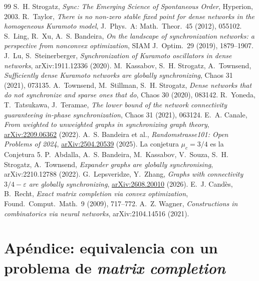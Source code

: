 \documentclass[11pt,a4paper]{article}
\begin{document}
\begin{thebibliography}{99}
 S.~H. Strogatz, \emph{Sync: The Emerging Science of Spontaneous Order}, Hyperion, 2003.
 R.~Taylor, \emph{There is no non-zero stable fixed point for dense networks in the homogeneous Kuramoto model}, J.\ Phys.\ A: Math.\ Theor.\ 45 (2012), 055102.
 S.~Ling, R.~Xu, A.~S. Bandeira, \emph{On the landscape of synchronization networks: a perspective from nonconvex optimization}, SIAM J.\ Optim.\ 29 (2019), 1879--1907.
 J.~Lu, S.~Steinerberger, \emph{Synchronization of Kuramoto oscillators in dense networks}, arXiv:1911.12336 (2020).
 M.~Kassabov, S.~H. Strogatz, A.~Townsend, \emph{Sufficiently dense Kuramoto networks are globally synchronizing}, Chaos 31 (2021), 073135.
 A.~Townsend, M.~Stillman, S.~H. Strogatz, \emph{Dense networks that do not synchronize and sparse ones that do}, Chaos 30 (2020), 083142.
 R.~Yoneda, T.~Tatsukawa, J.~Teramae, \emph{The lower bound of the network connectivity guaranteeing in-phase synchronization}, Chaos 31 (2021), 063124.
 E.~A. Canale, \emph{From weighted to unweighted graphs in synchronizing graph theory}, \href{https://arxiv.org/abs/2209.06362}{arXiv:2209.06362} (2022).
 A.~S. Bandeira et al., \emph{Randomstrasse101: Open Problems of 2024}, \href{https://arxiv.org/abs/2504.20539}{arXiv:2504.20539} (2025). La conjetura $\mu_c = 3/4$ es la Conjetura 5.
 P.~Abdalla, A.~S. Bandeira, M.~Kassabov, V.~Souza, S.~H. Strogatz, A.~Townsend, \emph{Expander graphs are globally synchronising}, arXiv:2210.12788 (2022).
 G.~Lepsveridze, Y.~Zhang, \emph{Graphs with connectivity $3/4-\varepsilon$ are globally synchronizing}, \href{https://arxiv.org/abs/2608.20010}{arXiv:2608.20010} (2026).
 E.~J. Candès, B.~Recht, \emph{Exact matrix completion via convex optimization}, Found.\ Comput.\ Math.\ 9 (2009), 717--772.
 A.~Z. Wagner, \emph{Constructions in combinatorics via neural networks}, arXiv:2104.14516 (2021).
\end{thebibliography}

\newpage

\section*{Apéndice: equivalencia con un problema de \emph{matrix completion}}
\setlength{\abovedisplayskip}{6pt}\setlength{\belowdisplayskip}{6pt}
\end{document}
